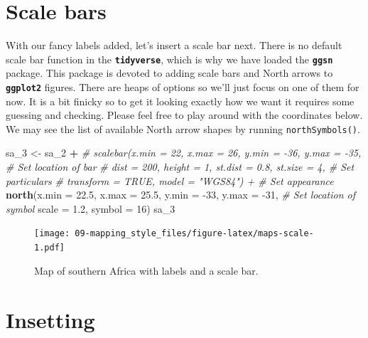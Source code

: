 \documentclass[
]{book}
\newenvironment{Shaded}{\begin{snugshade}}{\end{snugshade}}
\newcommand{\CommentTok}[1]{\textcolor[rgb]{0.56,0.35,0.01}{\textit{#1}}}
\newcommand{\DataTypeTok}[1]{\textcolor[rgb]{0.13,0.29,0.53}{#1}}
\newcommand{\DecValTok}[1]{\textcolor[rgb]{0.00,0.00,0.81}{#1}}
\newcommand{\FloatTok}[1]{\textcolor[rgb]{0.00,0.00,0.81}{#1}}
\newcommand{\KeywordTok}[1]{\textcolor[rgb]{0.13,0.29,0.53}{\textbf{#1}}}
\newcommand{\NormalTok}[1]{#1}
\newcommand{\OperatorTok}[1]{\textcolor[rgb]{0.81,0.36,0.00}{\textbf{#1}}}
\newcommand{\StringTok}[1]{\textcolor[rgb]{0.31,0.60,0.02}{#1}}
\begin{document}
\hypertarget{scale-bars}{%
\section{Scale bars}\label{scale-bars}}

With our fancy labels added, let's insert a scale bar next. There is no default scale bar function in the \textbf{\texttt{tidyverse}}, which is why we have loaded the \textbf{\texttt{ggsn}} package. This package is devoted to adding scale bars and North arrows to \textbf{\texttt{ggplot2}} figures. There are heaps of options so we'll just focus on one of them for now. It is a bit finicky so to get it looking exactly how we want it requires some guessing and checking. Please feel free to play around with the coordinates below. We may see the list of available North arrow shapes by running \texttt{northSymbols()}.

\begin{Shaded}
\begin{Highlighting}[]
\NormalTok{sa\_}\DecValTok{3}\NormalTok{ <{-}}\StringTok{ }\NormalTok{sa\_}\DecValTok{2} \OperatorTok{+}
\StringTok{  }\CommentTok{\# scalebar(x.min = 22, x.max = 26, y.min = {-}36, y.max = {-}35, \# Set location of bar}
\StringTok{  }\CommentTok{\#          dist = 200, height = 1, st.dist = 0.8, st.size = 4, \# Set particulars}
\StringTok{  }\CommentTok{\#          transform = TRUE, model = "WGS84") + \# Set appearance}
\StringTok{  }\KeywordTok{north}\NormalTok{(}\DataTypeTok{x.min =} \FloatTok{22.5}\NormalTok{, }\DataTypeTok{x.max =} \FloatTok{25.5}\NormalTok{, }\DataTypeTok{y.min =} \DecValTok{{-}33}\NormalTok{, }\DataTypeTok{y.max =} \DecValTok{{-}31}\NormalTok{, }\CommentTok{\# Set location of symbol}
        \DataTypeTok{scale =} \FloatTok{1.2}\NormalTok{, }\DataTypeTok{symbol =} \DecValTok{16}\NormalTok{)}
\NormalTok{sa\_}\DecValTok{3}
\end{Highlighting}
\end{Shaded}

\begin{figure}
\centering
\texttt{[image: 09-mapping\_style\_files/figure-latex/maps-scale-1.pdf]}
\caption{\label{fig:maps-scale}Map of southern Africa with labels and a scale bar.}
\end{figure}

\hypertarget{insetting}{%
\section{Insetting}\label{insetting}}
\end{document}
